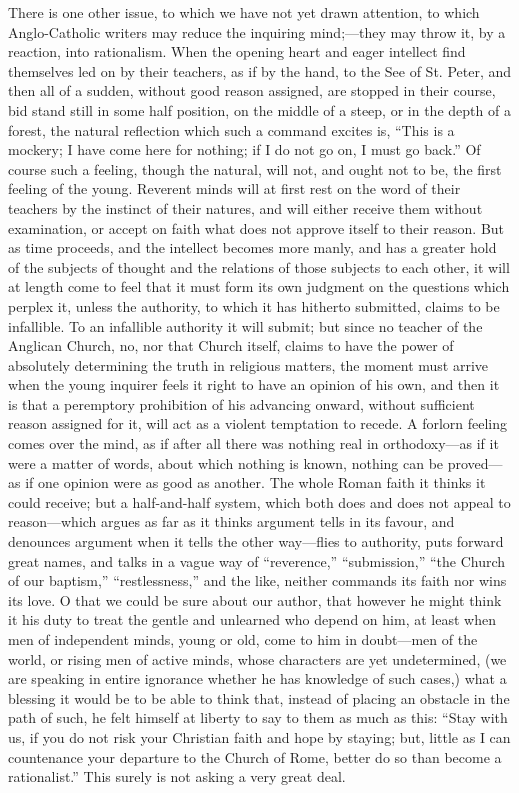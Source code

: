 There is one other issue, to which we have not
yet drawn attention, to which Anglo-Catholic writers may reduce the
inquiring mind;—they may throw it, by a reaction, into rationalism.
When the opening heart and eager intellect find themselves led on by
their teachers, as if by the hand, to the See of St. Peter, and then
all of a sudden, without good reason assigned, are stopped in their
course, bid stand still in some half position, on the middle of a
steep, or in the depth of a forest, the natural reflection which such
a command excites is, ``This is a mockery; I have come here for
nothing; if I do not go on, I must go back.'' Of course such a feeling,
though the natural, will not, and ought not to be, the first feeling
of the young. Reverent minds will at first rest on the word of their
teachers by the instinct of their natures, and will either receive
them without examination, or accept on faith what does not approve
itself to their reason. But as time proceeds, and the intellect
becomes more manly, and has a greater hold of the subjects of thought
and the relations of those subjects to each other, it will at length
come to feel that it must form its own judgment on the questions which
perplex it, unless the authority, to which it has hitherto submitted,
claims to be infallible. To an infallible authority it will submit;
but since no teacher of the Anglican Church, no, nor that Church
itself, claims to have the power of absolutely determining the truth
in religious matters, the moment must arrive when the young inquirer
feels it right to have an opinion of his own, and then it is that a
peremptory prohibition of his advancing onward, without sufficient
reason assigned for it, will act as a violent temptation to recede. A
forlorn feeling comes over the mind, as if after all there was
nothing real in orthodoxy—as if it were a matter of words, about
which nothing is known, nothing can be proved—as if one opinion were
as good as another. The whole Roman faith it thinks it could receive;
but a half-and-half system, which both does and does not appeal to
reason—which argues as far as it thinks argument tells in its favour,
and denounces argument when it tells the other way—flies to
authority, puts forward great names, and talks in a vague way of ``reverence,''
``submission,'' ``the Church of our baptism,'' ``restlessness,'' and the
like, neither commands its faith nor wins its love. O that we could be
sure about our author, that however he might think it his duty to
treat the gentle and unlearned who depend on him, at least when men of
independent minds, young or old, come to him in doubt—men of the
world, or rising men of active minds, whose characters are yet
undetermined, (we are speaking in entire ignorance whether he has
knowledge of such cases,) what a blessing it would be to be able to
think that, instead of placing an obstacle in the path of such, he
felt himself at liberty to say to them as much as this: ``Stay with us,
if you do not risk your Christian faith and hope by staying; but,
little as I can countenance your departure to the Church of Rome,
better do so than become a rationalist.'' This surely is not asking a
very great deal.

